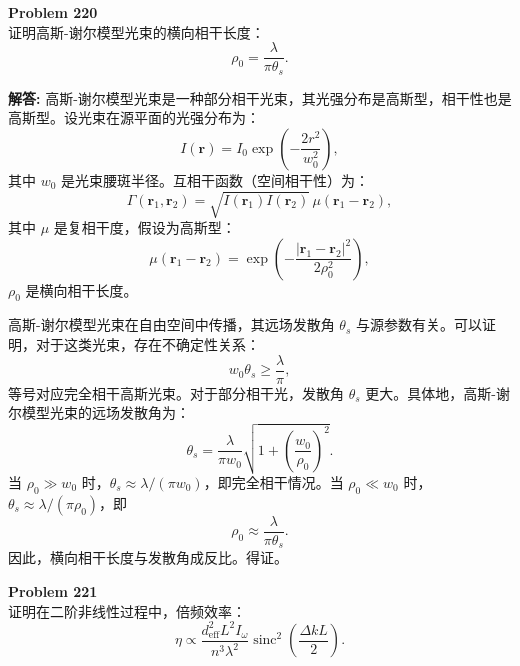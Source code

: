 \documentclass[12pt, a4paper, oneside]{ctexart}
\newenvironment{solution}{\par\noindent\textbf{解答:}\quad}{\par}
\begin{document}
\begin{mdframed}[backgroundcolor=gray!10, linewidth=0pt]
    \textbf{Problem 220} \\
    证明高斯-谢尔模型光束的横向相干长度：
    \[
    \rho_0 = \frac{\lambda}{\pi \theta_s}.
    \]
\end{mdframed}
\begin{solution}
    高斯-谢尔模型光束是一种部分相干光束，其光强分布是高斯型，相干性也是高斯型。设光束在源平面的光强分布为：
    \[
    I(\mathbf{r}) = I_0 \exp\left( -\frac{2r^2}{w_0^2} \right),
    \]
    其中 $w_0$ 是光束腰斑半径。互相干函数（空间相干性）为：
    \[
    \Gamma(\mathbf{r}_1, \mathbf{r}_2) = \sqrt{I(\mathbf{r}_1) I(\mathbf{r}_2)} \, \mu(\mathbf{r}_1 - \mathbf{r}_2),
    \]
    其中 $\mu$ 是复相干度，假设为高斯型：
    \[
    \mu(\mathbf{r}_1 - \mathbf{r}_2) = \exp\left( -\frac{|\mathbf{r}_1 - \mathbf{r}_2|^2}{2\rho_0^2} \right),
    \]
    $\rho_0$ 是横向相干长度。

    高斯-谢尔模型光束在自由空间中传播，其远场发散角 $\theta_s$ 与源参数有关。可以证明，对于这类光束，存在不确定性关系：
    \[
    w_0 \theta_s \ge \frac{\lambda}{\pi},
    \]
    等号对应完全相干高斯光束。对于部分相干光，发散角 $\theta_s$ 更大。具体地，高斯-谢尔模型光束的远场发散角为：
    \[
    \theta_s = \frac{\lambda}{\pi w_0} \sqrt{1 + \left( \frac{w_0}{\rho_0} \right)^2 }.
    \]
    当 $\rho_0 \gg w_0$ 时，$\theta_s \approx \lambda/(\pi w_0)$，即完全相干情况。当 $\rho_0 \ll w_0$ 时，$\theta_s \approx \lambda/(\pi \rho_0)$，即
    \[
    \rho_0 \approx \frac{\lambda}{\pi \theta_s}.
    \]
    因此，横向相干长度与发散角成反比。得证。
\end{solution}
\begin{mdframed}[backgroundcolor=gray!10, linewidth=0pt]
    \textbf{Problem 221} \\
    证明在二阶非线性过程中，倍频效率：
    \[
    \eta \propto \frac{d_{\text{eff}}^2 L^2 I_\omega}{n^3 \lambda^2} \operatorname{sinc}^2 \left( \frac{\Delta k L}{2} \right).
    \]
\end{mdframed}
\end{document}
